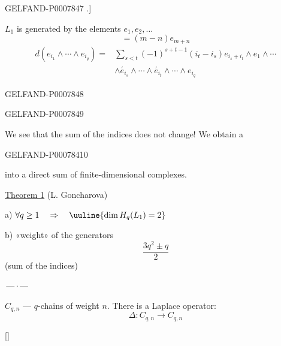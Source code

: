 \begin{GelfandAdjacentEvidence}{GELFAND-P000784}{7}
.]

\(L_1\) is generated by the elements \(e_1,e_2,\ldots\)
\begin{equation}
[e_n,e_m]=(m-n)e_{m+n}\tag{10}
\end{equation}
\begin{equation}
\begin{aligned}
d(e_{i_1}\wedge\cdots\wedge e_{i_q})
={}&\sum_{s<t}(-1)^{s+t-1}(i_t-i_s)e_{i_s+i_t}\wedge e_1\wedge\cdots\\
&\wedge\overset{'}{e}_{i_s}\wedge\cdots\wedge\overset{'}{e}_{i_t}
\wedge\cdots\wedge e_{i_q}
\end{aligned}\tag{11}
\end{equation}
\end{GelfandAdjacentEvidence}
\begin{GelfandAdjacentEvidence}{GELFAND-P000784}{8}

\end{GelfandAdjacentEvidence}
\begin{GelfandAdjacentEvidence}{GELFAND-P000784}{9}


We see that the sum of the indices does not change! We obtain a
\end{GelfandAdjacentEvidence}
\begin{GelfandAdjacentEvidence}{GELFAND-P000784}{10}

into a direct sum of finite-dimensional complexes.

\underline{Theorem 1} (L. Goncharova)

a) \(\forall q\geq1\quad\Rightarrow\quad\uuline{\dim H_q(L_1)=2}\)

b) «weight» of the generators
\[
\frac{3q^2\pm q}{2}
\]
(sum of the indices)

\begin{center}\(\text{---}\,\cdot\,\text{---}\)\end{center}

\(C_{q,n}\) --- \(q\)-chains of weight \(n\). There is a Laplace operator:
\begin{equation}
\Delta:C_{q,n}\longrightarrow C_{q,n}\tag{12}
\end{equation}

[]
\end{GelfandAdjacentEvidence}


